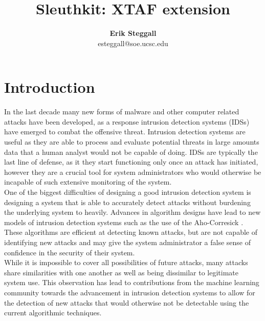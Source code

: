 \documentclass[12pt]{article} %
\title{Sleuthkit: XTAF extension}
\author{\textbf{Erik Steggall}\\ esteggall@soe.ucsc.edu}
\date{} %
\begin{document}
\maketitle
\thispagestyle{empty}





\section{Introduction}
In the last decade many new forms of malware and other computer related attacks have been developed, as a response intrusion detection systems (IDSs) have emerged to combat the offensive threat. Intrusion detection systems are useful as they are able to process and evaluate potential threats in large amounts  data that a human analyst would not be capable of doing. IDSs are typically the last line of defense, as it they start functioning only once an attack has initiated, however they are a crucial tool for system administrators who would otherwise be incapable of such extensive monitoring of the system.\\
One of the biggest difficulties of designing a good intrusion detection system is designing a system that is able to accurately detect attacks without burdening the underlying system to heavily. Advances in algorithm designs have lead to new models of intrusion detection systems such as the use of the Aho-Corresick \cite{tuck04}. These algorithms are efficient at detecting known attacks, but are not capable of identifying new attacks and may give the system administrator a false sense of confidence in the security of their system.\\
While it is impossible to cover all possibilities of future attacks, many attacks share similarities with one another as well as being dissimilar to legitimate system use. This observation has lead to contributions from the machine learning community towards the advancement in intrusion detection systems to allow for the detection of new attacks that would otherwise not be detectable using the current algorithmic techniques.\\ 

\end{document}
